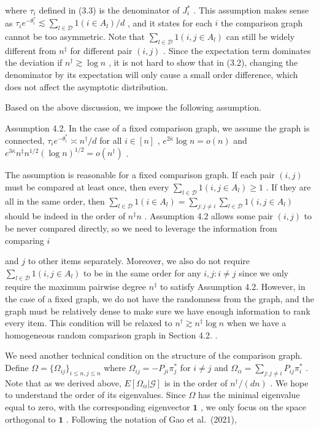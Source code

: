 where \(\tau_{i}\) defined in (3.3) is the denominator of \(J_{i}^{*}\)
. This assumption makes sense as
\(\tau_{i}e^{- \theta_{i}^{*}}\lesssim \sum_{l\in \mathcal{D}}1(i\in A_{l}) / d\)
, and it states for each \(i\) the comparison graph cannot be too
asymmetric. Note that \(\sum_{l\in \mathcal{D}}1(i,j\in A_{l})\) can
still be widely different from \(n^{\ddagger}\) for different pair
\((i,j)\) . Since the expectation term dominates the deviation if
\(n^{\dagger}\gtrsim \log n\) , it is not hard to show that in (3.2),
changing the denominator by its expectation will only cause a small
order difference, which does not affect the asymptotic distribution.

Based on the above discussion, we impose the following assumption.

Assumption 4.2. In the case of a fixed comparison graph, we assume the
graph is connected,
\(\tau_{i}e^{- \theta_{i}^{*}}\asymp n^{\dagger} / d\) for all
\(i\in [n]\) , \(e^{2\bar{\kappa}}\log n = o(n)\) and
\(e^{3\bar{\kappa}}n^{\ddagger}n^{1 / 2}(\log n)^{1 / 2} = o(n^{\dagger})\)
.

The assumption is reasonable for a fixed comparison graph. If each pair
\((i,j)\) must be compared at least once, then every
\(\sum_{l\in \mathcal{D}}1(i,j\in A_{l})\geq 1\) . If they are all in
the same order, then
\(\sum_{l\in \mathcal{D}}1(i\in A_{l}) = \sum_{j:j\neq i}\sum_{l\in \mathcal{D}}1(i,j\in A_{l})\)
should be indeed in the order of \(n^{\ddagger}n\) . Assumption 4.2
allows some pair \((i,j)\) to be never compared directly, so we need to
leverage the information from comparing \(i\)

and \(j\) to other items separately. Moreover, we also do not require
\(\sum_{l\in \mathcal{D}}1(i,j\in A_l)\) to be in the same order for any
\(i,j:i\neq j\) since we only require the maximum pairwise degree
\(n^{\ddagger}\) to satisfy Assumption 4.2. However, in the case of a
fixed graph, we do not have the randomness from the graph, and the graph
must be relatively dense to make sure we have enough information to rank
every item. This condition will be relaxed to
\(n^{\dagger}\gtrsim n^{\ddagger}\log n\) when we have a homogeneous
random comparison graph in Section 4.2. .

We need another technical condition on the structure of the comparison
graph. Define \(\Omega = \{\Omega_{ij}\}_{i\leq n,j\leq n}\) where
\(\Omega_{ij} = - P_{ji}\pi_j^*\) for \(i\neq j\) and
\(\Omega_{ii} = \sum_{j:j\neq i}P_{ij}\pi_i^*\) . Note that as we
derived above, \(E[\Omega_{ii}|\mathcal{G}]\) is in the order of
\(n^{\dagger} / (dn)\) . We hope to understand the order of its
eigenvalues. Since \(\Omega\) has the minimal eigenvalue equal to zero,
with the corresponding eigenvector \(\mathbf{1}\) , we only focus on the
space orthogonal to \(\mathbf{1}\) . Following the notation of Gao et
al.~(2021),

